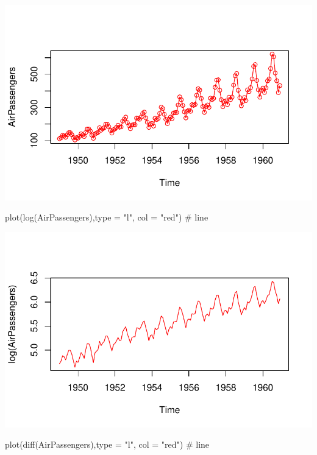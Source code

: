 \documentclass[
  letterpaper,
  DIV=11,
  numbers=noendperiod]{scrreprt}
\newenvironment{Shaded}{\begin{snugshade}}{\end{snugshade}}
\newcommand{\AttributeTok}[1]{\textcolor[rgb]{0.40,0.45,0.13}{#1}}
\newcommand{\CommentTok}[1]{\textcolor[rgb]{0.37,0.37,0.37}{#1}}
\newcommand{\FunctionTok}[1]{\textcolor[rgb]{0.28,0.35,0.67}{#1}}
\newcommand{\NormalTok}[1]{\textcolor[rgb]{0.00,0.23,0.31}{#1}}
\newcommand{\StringTok}[1]{\textcolor[rgb]{0.13,0.47,0.30}{#1}}
\begin{document}
\includegraphics{data_analysis_files/figure-pdf/unnamed-chunk-5-3.pdf}

\begin{Shaded}
\begin{Highlighting}[]
\FunctionTok{plot}\NormalTok{(}\FunctionTok{log}\NormalTok{(AirPassengers),}\AttributeTok{type =} \StringTok{"l"}\NormalTok{, }\AttributeTok{col =} \StringTok{"red"}\NormalTok{) }\CommentTok{\# line}
\end{Highlighting}
\end{Shaded}

\includegraphics{data_analysis_files/figure-pdf/unnamed-chunk-5-4.pdf}

\begin{Shaded}
\begin{Highlighting}[]
\FunctionTok{plot}\NormalTok{(}\FunctionTok{diff}\NormalTok{(AirPassengers),}\AttributeTok{type =} \StringTok{"l"}\NormalTok{, }\AttributeTok{col =} \StringTok{"red"}\NormalTok{) }\CommentTok{\# line}
\end{Highlighting}
\end{Shaded}
\end{document}
